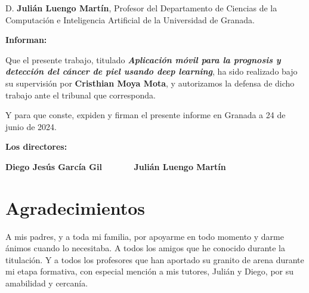 \vspace{0.5cm}

D. \textbf{Julián Luengo Martín}, Profesor del Departamento de Ciencias de la Computación e Inteligencia Artificial
 de la Universidad de Granada.


\vspace{0.5cm}

\textbf{Informan:}

\vspace{0.5cm}

Que el presente trabajo, titulado \textit{\textbf{Aplicación móvil para la prognosis y detección del cáncer de piel usando deep learning}},
ha sido realizado bajo su supervisión por \textbf{Cristhian Moya Mota}, y autorizamos la defensa de dicho trabajo ante el tribunal
que corresponda.

\vspace{0.5cm}

Y para que conste, expiden y firman el presente informe en Granada a 24 de junio de 2024.

\vspace{1cm}

\textbf{Los directores:}

\vspace{5cm}

\noindent \textbf{Diego Jesús García Gil \ \ \ \ \ \ Julián Luengo Martín}

\chapter*{Agradecimientos}
\thispagestyle{empty}

       \vspace{1cm}


A mis padres, y a toda mi familia, por apoyarme en todo momento y darme ánimos cuando lo necesitaba. A todos los amigos que he conocido durante la titulación. Y a todos los profesores que han aportado su granito de arena durante mi etapa formativa, con especial mención a mis tutores, Julián y Diego, por su amabilidad y cercanía.

